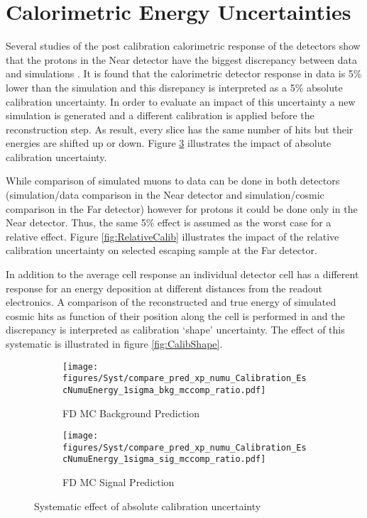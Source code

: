 \section{Calorimetric Energy Uncertainties}
Several studies of the post calibration calorimetric response of the detectors show that the protons in the Near detector
have the biggest discrepancy between data and simulations \cite{ecalib_talk}. It is found that the calorimetric detector
response in data is 5\% lower than the simulation and this disrepancy is interpreted as a 5\% absolute calibration
uncertainty. In order to evaluate an impact of this uncertainty a new simulation is generated and a different calibration
is applied before the reconstruction step. As result, every slice has the same number of hits but their energies are 
shifted up or down. Figure \ref{fig:Calibration} illustrates the impact of absolute calibration uncertainty.

While comparison of simulated muons to data can be done in both detectors (simulation/data comparison in the Near detector 
and simulation/cosmic comparison in the Far detector) however for protons it could be done only in the Near detector.  
Thus, the same 5\% effect is assumed as the worst case for a relative effect. Figure \ref{fig:RelativeCalib} illustrates 
the impact of the relative calibration uncertainty on selected escaping sample at the Far detector. 

In addition to the average cell response an individual detector cell has a different response for an energy deposition 
at different distances from the readout electronics. 
A comparison of the reconstructed and true energy of simulated cosmic hits as function of their position along the cell 
is performed in \cite{shape_talk} and the discrepancy is interpreted as calibration `shape' uncertainty. The effect of this 
systematic is illustrated in figure \ref{fig:CalibShape}.  

\clearpage
\begin{figure}[t!]
\begin{subfigure}[t]{0.5\textwidth}
  \centering
  \texttt{[image: figures/Syst/compare\_pred\_xp\_numu\_Calibration\_EscNumuEnergy\_1sigma\_bkg\_mccomp\_ratio.pdf]}
  \caption{FD MC Background Prediction}
  \label{fig:bkg_Calibration}
\end{subfigure}%
\begin{subfigure}[t]{0.5\textwidth}
  \centering
  \texttt{[image: figures/Syst/compare\_pred\_xp\_numu\_Calibration\_EscNumuEnergy\_1sigma\_sig\_mccomp\_ratio.pdf]}
  \caption{FD MC Signal Prediction}
  \label{fig:sig_Calibration}
\end{subfigure}
\caption{ Systematic effect of absolute calibration uncertainty }
\label{fig:Calibration}
\end{figure}

